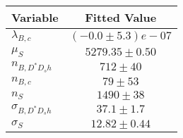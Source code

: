 \begin{tabular}[t]{lc}
\hline
Variable &Fitted Value\\
\hline\hline
$\lambda_{B,c}$&$(-0.0\pm5.3)e-07$\\
\hline
$\mu_S$&$5279.35\pm0.50$\\
\hline
$n_{B, D^* D_s h}$&$712\pm40$\\
\hline
$n_{B,c}$&$79\pm53$\\
\hline
$n_S$&$1490\pm38$\\
\hline
$\sigma_{B, D^* D_s h}$&$37.1\pm1.7$\\
\hline
$\sigma_S$&$12.82\pm0.44$\\
\hline
\end{tabular}